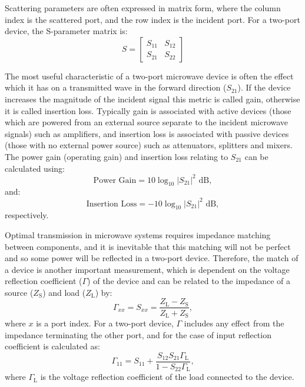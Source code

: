 \documentclass[../thesis/thesis.tex]{subfiles}
\begin{document}
Scattering parameters are often expressed in matrix form, where the column index is the scattered port, and the row index is the incident port. For a two-port device, the S-parameter matrix is:
\begin{equation}
S=
\begin{bmatrix}
S_{11} & S_{12} \\
S_{21} & S_{22}
\end{bmatrix}
\end{equation}

The most useful characteristic of a two-port microwave device is often the effect which it has on a transmitted wave in the forward direction ($S_{21}$). If the device increases the magnitude of the incident signal this metric is called gain, otherwise it is called insertion loss. Typically gain is associated with active devices (those which are powered from an external source separate to the incident microwave signals) such as amplifiers, and insertion loss is associated with passive devices (those with no external power source) such as attenuators, splitters and mixers. The power gain (operating gain) and insertion loss relating to $S_{21}$ can be calculated using:
\begin{equation}
\textrm{Power Gain} = 10 \log_{10} |S_{21}|^2 \textrm{ dB},
\end{equation}
and:
\begin{equation}
\textrm{Insertion Loss} = -10 \log_{10} |S_{21}|^2 \textrm{ dB},
\end{equation}
respectively.

Optimal transmission in microwave systems requires impedance matching between components, and it is inevitable that this matching will not be perfect and so some power will be reflected in a two-port device. Therefore, the match of a device is another important measurement, which is dependent on the voltage reflection coefficient ($\Gamma$) of the device and can be related to the impedance of a source ($Z_\textrm{S}$) and load ($Z_\textrm{L}$) by:
\begin{equation}
\Gamma_{xx} = S_{xx} = \dfrac{Z_\textrm{L}-Z_\textrm{S}}{Z_\textrm{L}+Z_\textrm{S}},
\label{gamma1}
\end{equation}
where $x$ is a port index.
For a two-port device, $\Gamma$ includes any effect from the impedance terminating the other port, and for the case of input reflection coefficient is calculated as:
\begin{equation}
\Gamma_{11} = S_{11} + \dfrac{S_{12}S_{21}\Gamma_\textrm{L}}
{1-S_{22}\Gamma_\textrm{L}},
\label{gamma2}
\end{equation}
where $\Gamma_\textrm{L}$ is the voltage reflection coefficient of the load connected to the device.
\end{document}
